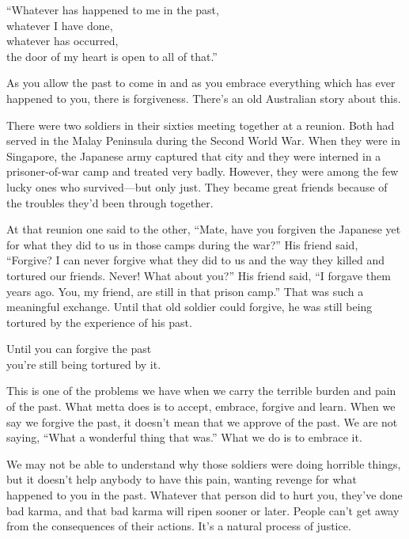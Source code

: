 \documentclass[12pt, openany]{book}
\newenvironment{aphorism}%
{%
\begin{center}\begin{itshape}
}%
{\end{itshape}\end{center}
}%
\begin{document}
\begin{aphorism}
“Whatever has happened to me in the past,\\  
whatever I have done,\\ 
whatever has occurred,\\  
the door of my heart is open to all of that.”
\end{aphorism}

As you allow the past to come in and as you embrace everything which has ever happened to you, there is forgiveness. There’s an old Australian story about this. 

There were two soldiers in their sixties meeting together at a reunion. Both had served in the Malay Peninsula during the Second World War. When they were in Singapore, the Japanese army captured that city and they were interned in a prisoner-of-war camp and treated very badly. However, they were among the few lucky ones who survived—but only just. They became great friends because of the troubles they’d been through together. 

At that reunion one said to the other, “Mate, have you forgiven the Japanese yet for what they did to us in those camps during the war?” His friend said, “Forgive? I can never forgive what they did to us and the way they killed and tortured our friends. Never! What about you?” His friend said, “I forgave them years ago. You, my friend, are still in that prison camp.” That was such a meaningful exchange. Until that old soldier could forgive, he was still being tortured by the experience of his past. 

\begin{aphorism}
Until you can forgive the past\\  
you’re still being tortured by it.
\end{aphorism}

This is one of the problems we have when we carry the terrible burden and pain of the past. What metta does is to accept, embrace, forgive and learn. When we say we forgive the past, it doesn’t mean that we approve of the past. We are not saying, “What a wonderful thing that was.” What we do is to embrace it. 

We may not be able to understand why those soldiers were doing horrible things, but it doesn’t help anybody to have this pain, wanting revenge for what happened to you in the past. Whatever that person did to hurt you, they’ve done bad karma, and that bad karma will ripen sooner or later. People can’t get away from the consequences of their actions. It’s a natural process of justice. 
\end{document}
